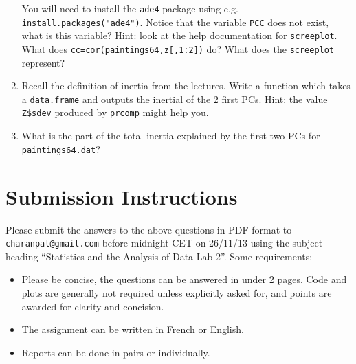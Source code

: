 \documentclass[a4paper,10pt]{article}
\begin{document}
\begin{enumerate}
You will need to install the \texttt{ade4} package using e.g. \texttt{install.packages("ade4")}.  Notice that the variable \texttt{PCC} does not exist, what is this variable? Hint: look at the help documentation for \texttt{screeplot}. What does \texttt{cc=cor(paintings64,z[,1:2])} do? What does the \texttt{screeplot} represent? 
\item Recall the definition of inertia from the lectures. Write a function which takes a \texttt{data.frame} and outputs the inertial of the 2 first PCs. Hint: the value \texttt{Z\$sdev} produced by \texttt{prcomp} might help you. 
\item What is the part of the total inertia explained by the first two PCs for \texttt{paintings64.dat}?  
\end{enumerate}

\section{Submission Instructions}

Please submit the answers to the above questions in PDF format to \texttt{charanpal@gmail.com} before midnight CET on 26/11/13 using the subject heading ``Statistics and the Analysis of Data Lab 2''. Some requirements: 
\begin{itemize} 
 \item Please be concise, the questions can be answered in under 2 pages. Code and plots are generally not required unless explicitly asked for, and points are awarded for clarity and concision. 
 \item The assignment can be written in French or English. 
 \item Reports can be done in pairs or individually.    
\end{itemize}
\end{document}
